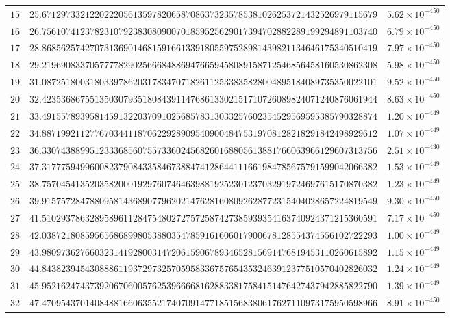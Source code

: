\documentclass[12pt,reqno]{amsart}
\theoremstyle{remark}
\begin{document}
\begin{longtable}{clc}
$15$ & $25.6712973321220222056135978206587086373235785381026253721432526979115679$ & $5.62\times 10^{-450}$ \\
$16$ & $26.7561074123782310792383080900701859525629017394702882289199294891103740$ & $6.79\times 10^{-450}$ \\
$17$ & $28.8685625742707313690146815916613391805597528981439821134646175340510419$ & $7.97\times 10^{-450}$ \\
$18$ & $29.2196908337057777829025666848869476659458089158712546856458160530862308$ & $5.98\times 10^{-450}$ \\
$19$ & $31.0872518003180339786203178347071826112533835828004895184089735350022101$ & $9.52\times 10^{-450}$ \\
$20$ & $32.4235368675513503079351808439114768613302151710726089824071240876061944$ & $8.63\times 10^{-450}$ \\
$21$ & $33.4915578939581459132203709102568578313033257602354529569595385790328874$ & $1.20\times 10^{-449}$ \\
$22$ & $34.8871992112776703441187062292890954090048475319708128218291842498929612$ & $1.07\times 10^{-449}$ \\
$23$ & $36.3307438899512333685607557336024568260168805613881766063966129607313756$ & $2.51\times 10^{-430}$ \\
$24$ & $37.3177759499600823790843358467388474128644111661984785675791599042066382$ & $1.53\times 10^{-449}$ \\
$25$ & $38.7570454135203582000192976074646398819252301237032919724697615170870382$ & $1.23\times 10^{-449}$ \\
$26$ & $39.9157572847880958143689077962021476281608092628772315404028657224819549$ & $9.30\times 10^{-450}$ \\
$27$ & $41.5102937863289589611284754802727572587427385939354163740924371215360591$ & $7.17\times 10^{-450}$ \\
$28$ & $42.0387218085956568689980538803547859161606017900678128554374556102722293$ & $1.00\times 10^{-449}$ \\
$29$ & $43.9809736276603231419280031472061590678934652815691476819453110260615892$ & $1.15\times 10^{-449}$ \\
$30$ & $44.8438239454308886119372973257059583367576543532463912377510570402826032$ & $1.24\times 10^{-449}$ \\
$31$ & $45.9521624743739206706005762539666681628833817584151476427437942885822790$ & $1.39\times 10^{-449}$ \\
$32$ & $47.4709543701408488166063552174070914771851568380617627110973175950598966$ & $8.91\times 10^{-450}$ \\

\end{longtable}
\end{document}
